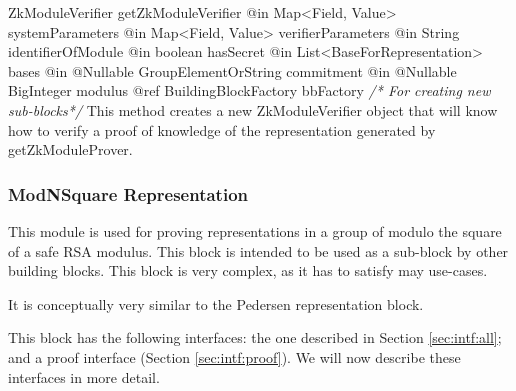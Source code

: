       \begin{method}
      {ZkModuleVerifier}
      {getZkModuleVerifier}
      {
        {@in Map<Field, Value> systemParameters}
        {@in Map<Field, Value> verifierParameters}
        {@in String identifierOfModule}
        {@in boolean hasSecret}
        {@in List<BaseForRepresentation> bases}
        {@in @Nullable GroupElementOrString commitment}
        {@in @Nullable BigInteger modulus}
        {@ref BuildingBlockFactory bbFactory \textrm{\emph{/* For creating new sub-blocks*/}}}
      }
      This method creates a new ZkModuleVerifier object that will know how to
      verify a proof of knowledge of the representation generated by getZkModuleProver.
      \end{method}

    \subsubsection{ModNSquare Representation}

    This module is used for proving representations
    in a group of modulo the square of a safe RSA modulus.
    This block is intended to be used as a sub-block by other building
    blocks. This block is very complex, as it has to satisfy may use-cases.

    It is conceptually very similar to the Pedersen representation block.

    This block has the following interfaces:
    the one described in Section \ref{sec:intf:all};
    and a proof interface (Section \ref{sec:intf:proof}).
      We will now describe these interfaces in more detail.

